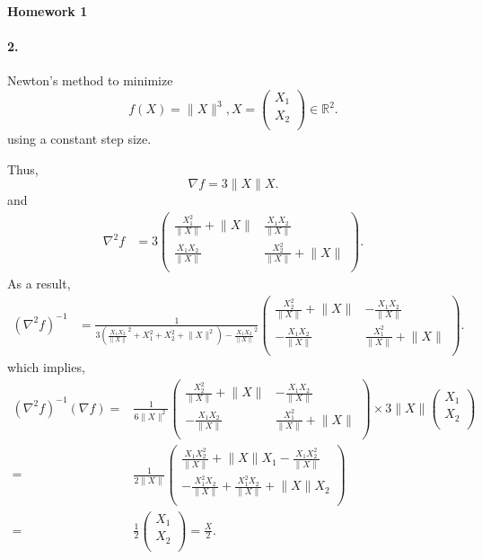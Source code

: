 \documentclass[12pt, leqno]{article}
\providecommand{\norm}[1]{\lVert#1\rVert}
\begin{document}
\pagestyle{fancy}

\begin{center}
{\large {\bf Homework 1}} \\
\end{center}

\paragraph{2.} Newton's method to minimize 
\[
f(X) = \norm{X}^3, X = \begin{pmatrix}
X_1\\ 
X_2\\ 
\end{pmatrix} \in\mathbb{R}^2.
\]
using a constant step size.

Thus, 
\[
\nabla f = 3\norm{X}X.
\]
and
\begin{align*}
\nabla^2 f  &=  3\begin{pmatrix}
\frac{X_1^2}{\norm{X}}+\norm{X}&\frac{X_1X_2}{\norm{X}}\\ 
\frac{X_1X_2}{\norm{X}}&\frac{X_2^2}{\norm{X}}+\norm{X}\\ 
\end{pmatrix}.
\end{align*}
As a result, 
\begin{align*}
(\nabla^2 f)^{-1}  &=  \frac{1}{3({\frac{X_1X_2}{\norm{X}}}^2 + X_1^2
                     + X_2^2 + \norm{X}^2) - {\frac{X_1X_2}{\norm{X}}}^2}\begin{pmatrix}
\frac{X_2^2}{\norm{X}}+\norm{X}&-\frac{X_1X_2}{\norm{X}}\\ 
-\frac{X_1X_2}{\norm{X}}&\frac{X_1^2}{\norm{X}}+\norm{X}\\ 
\end{pmatrix}.
\end{align*}
which implies,
\begin{align*}
  (\nabla^2 f)^{-1} (\nabla f) =& \frac{1}{6 \norm{X}^2}
\begin{pmatrix}
\frac{X_2^2}{\norm{X}}+\norm{X}&-\frac{X_1X_2}{\norm{X}}\\ 
-\frac{X_1X_2}{\norm{X}}&\frac{X_1^2}{\norm{X}}+\norm{X}\\ 
\end{pmatrix} \times 3\norm{X} \begin{pmatrix}
X_1\\ 
X_2\\ 
\end{pmatrix}
\\
=&
\frac{1}{2 \norm{X}}
\begin{pmatrix}
\frac{X_1X_2^2}{\norm{X}}+\norm{X}X_1-\frac{X_1X_2^2}{\norm{X}}\\ 
-\frac{X_1^2X_2}{\norm{X}}+\frac{X_1^2X_2}{\norm{X}}+\norm{X}X_2\\ 
\end{pmatrix} 
\\
=& \frac{1}{2} \begin{pmatrix}
X_1\\ 
X_2\\ 
\end{pmatrix} = \frac{X}{2}.
\end{align*}
\end{document}

